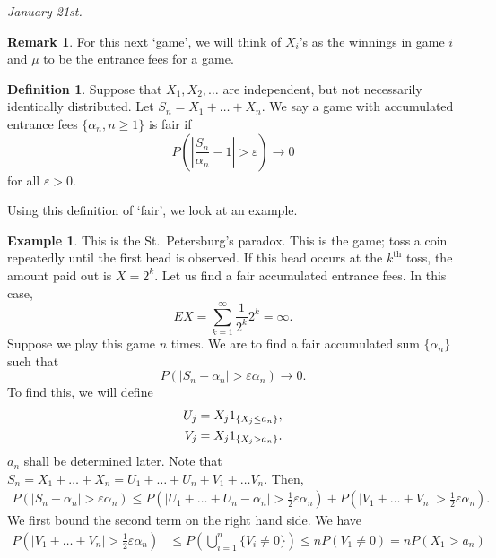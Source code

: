 \documentclass[15pt,a4paper]{book}
\theoremstyle{definition}
\newtheorem{definition}[theorem]{Definition}
\newtheorem{example}[theorem]{Example}
\newtheorem{remark}[theorem]{Remark}
\newcommand{\abs}[1]{\left| #1 \right|} %
\begin{document}
\textit{January 21st.}
\begin{remark}
    For this next `game', we will think of $X_{i}$'s as the winnings in game $i$ and $\mu$ to be the entrance fees for a game.
\end{remark}
\begin{definition}
    Suppose that $X_{1},X_{2},\ldots$ are independent, but not necessarily identically distributed. Let $S_{n} = X_{1} + \ldots + X_{n}$. We say a game with accumulated entrance fees $\{\alpha_{n},n\geq 1\}$ is fair if
    \begin{equation}
        P(\abs{\frac{S_{n}}{\alpha_{n}}-1} > \varepsilon) \to 0
    \end{equation}
    for all $\varepsilon > 0$.
\end{definition}
Using this definition of `fair', we look at an example.
\begin{example}
    This is the St.\ Petersburg's paradox. This is the game; toss a coin repeatedly until the first head is observed. If this head occurs at the $k^{\text{th}}$ toss, the amount paid out is $X = 2^{k}$. Let us find a fair accumulated entrance fees. In this case,
    \begin{equation}
        EX = \sum_{k=1}^{\infty} \frac{1}{2^{k}} 2^{k} = \infty.
    \end{equation}
    Suppose we play this game $n$ times. We are to find a fair accumulated sum $\{\alpha_{n}\}$ such that
    \begin{equation}
        P(\abs{S_{n}-\alpha_{n}} > \varepsilon \alpha_{n}) \to 0.
    \end{equation}
    To find this, we will define
    \begin{align}
        U_{j} &= X_{j} 1_{\{X_{j}\leq a_{n}\}}, \notag \\
        V_{j} &= X_{j} 1_{\{X_{j} > a_{n}\}}. \notag
    \end{align}
    $a_{n}$ shall be determined later. Note that $S_{n} = X_{1} + \ldots + X_{n} = U_{1} + \ldots + U_{n} + V_{1} + \ldots V_{n}$. Then,
    \begin{align}
        P(\abs{S_{n}-\alpha_{n}} > \varepsilon \alpha_{n}) \leq  P(\abs{U_{1}+\ldots+U_{n}-\alpha_{n}} > \frac{1}{2}\varepsilon \alpha_{n}) + P(\abs{V_{1} + \ldots + V_{n}} > \frac{1}{2}\varepsilon \alpha_{n}).
    \end{align}
    We first bound the second term on the right hand side. We have
    \begin{align}
        P(\abs{V_{1} + \ldots + V_{n}} > \frac{1}{2}\varepsilon \alpha_{n}) &\leq P(\bigcup_{i=1}^{n} \{V_{i} \neq 0\}) \leq nP(V_{1} \neq 0) = nP(X_{1} > a_{n}) \\

\end{align}
\end{example}
\end{document}
